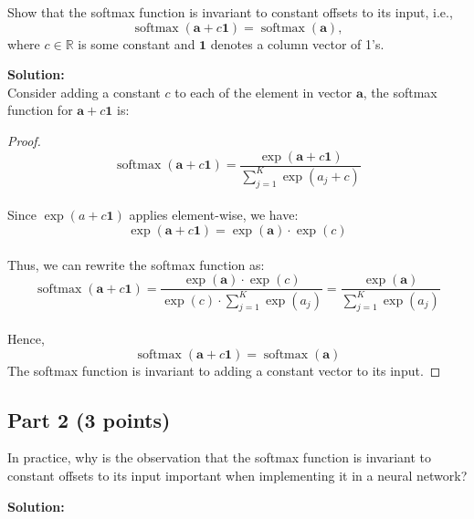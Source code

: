 \documentclass[11pt, oneside]{article}   	%
\begin{document}
Show that the softmax function is invariant to constant offsets to its input, i.e., 
\[
\operatorname{softmax} \left( {{\mathbf{a}} + {c\mathbf{1}}} \right) = \operatorname{softmax} \left( {\mathbf{a}} \right),
\]
where $c\in \mathbb{R}$ is some constant and $\mathbf{1}$ denotes a column vector of 1's.

\textbf{Solution:} \\

Consider adding a constant $c$ to each of the element in vector $\mathbf{a}$, the softmax function for $\mathbf{a} + c\mathbf{1}$ is:
\begin{proof}
    \begin{equation*}
        \operatorname{softmax} \left( {{\mathbf{a}} + {c\mathbf{1}}} \right) = \frac{\exp(\mathbf{a} + c\mathbf{1})}{\sum_{j=1}^{K}\exp(a_j + c)}
    \end{equation*}
    \\
    Since $\exp(a + c\mathbf{1})$ applies element-wise, we have:
    \begin{equation*}
        \exp(\mathbf{a} + c\mathbf{1}) = \exp(\mathbf{a}) \cdot \exp(c)
    \end{equation*}
    \\
    Thus, we can rewrite the softmax function as:
    \begin{equation*}
        \operatorname{softmax} \left( {{\mathbf{a}} + {c\mathbf{1}}} \right) = \frac{\exp(\mathbf{a}) \cdot \exp(c)}{\exp(c) \cdot \sum_{j=1}^{K}\exp(a_j)} = \frac{\exp(\mathbf{a})}{\sum_{j=1}^{K}\exp(a_j)}
    \end{equation*}
    \\
    Hence,
    \begin{equation*}
        \operatorname{softmax} \left( {{\mathbf{a}} + {c\mathbf{1}}} \right) = \operatorname{softmax} \left( {{\mathbf{a}}} \right) 
    \end{equation*}
    The softmax function is invariant to adding a constant vector to its input.
\end{proof}

\subsection*{Part 2 (3 points)}
In practice, why is the observation that the softmax function is invariant to constant offsets to its input important when implementing it in a neural network?

\textbf{Solution:} \\
\end{document}
